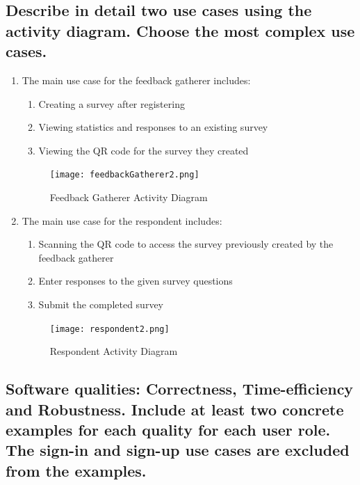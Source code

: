 \documentclass[letterpaper, 12 pt, conference]{ieeeconf}
\begin{document}
\newpage
\subsection{Describe in detail two use cases using the activity diagram. Choose the most complex use cases.}
\begin{enumerate}
    \item The main use case for the feedback gatherer includes: 
    \begin{enumerate}
        \item Creating a survey after registering
        \item Viewing statistics and responses to an existing survey
        \item Viewing the QR code for the survey they created
    \end{enumerate}

    \begin{figure}[h]
        \centering
        \texttt{[image: feedbackGatherer2.png]}
        \caption{Feedback Gatherer Activity Diagram}
    \end{figure}
\newpage
    \item The main use case for the respondent includes:
    \begin{enumerate}
        \item Scanning the QR code to access the survey previously created by the feedback gatherer
        \item Enter responses to the given survey questions
        \item Submit the completed survey
    \end{enumerate}
    \linebreak

    \begin{figure}[h]
    \centering
    \texttt{[image: respondent2.png]}
    \caption{Respondent Activity Diagram}
    \end{figure}

\end{enumerate}
\hfill \break
\newpage

\subsection{Software qualities: Correctness, Time-eﬀiciency and Robustness. Include at least two concrete examples for each quality for each user role. The sign-in and sign-up use cases are excluded from the examples.}
\linebreak
\end{document}
